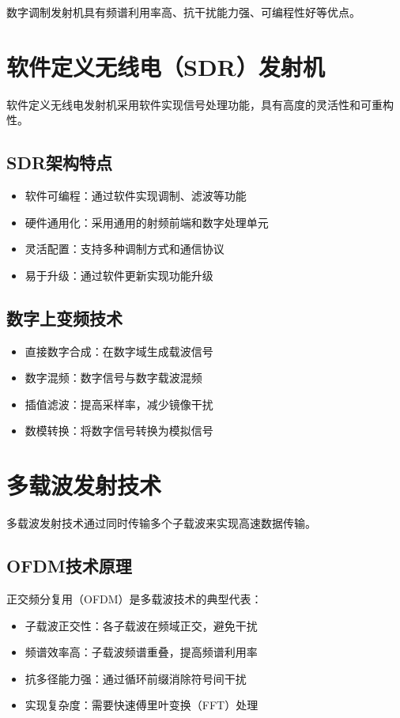 \documentclass[12pt,UTF8]{ctexbook}
\begin{document}
数字调制发射机具有频谱利用率高、抗干扰能力强、可编程性好等优点。

\section{软件定义无线电（SDR）发射机}

软件定义无线电发射机采用软件实现信号处理功能，具有高度的灵活性和可重构性。

\subsection{SDR架构特点}
\begin{itemize}[leftmargin=3.5em]
    \item 软件可编程：通过软件实现调制、滤波等功能
    \item 硬件通用化：采用通用的射频前端和数字处理单元
    \item 灵活配置：支持多种调制方式和通信协议
    \item 易于升级：通过软件更新实现功能升级
\end{itemize}

\subsection{数字上变频技术}
\begin{itemize}[leftmargin=3.5em]
    \item 直接数字合成：在数字域生成载波信号
    \item 数字混频：数字信号与数字载波混频
    \item 插值滤波：提高采样率，减少镜像干扰
    \item 数模转换：将数字信号转换为模拟信号
\end{itemize}

\section{多载波发射技术}

多载波发射技术通过同时传输多个子载波来实现高速数据传输。

\subsection{OFDM技术原理}
正交频分复用（OFDM）是多载波技术的典型代表：
\begin{itemize}[leftmargin=3.5em]
    \item 子载波正交性：各子载波在频域正交，避免干扰
    \item 频谱效率高：子载波频谱重叠，提高频谱利用率
    \item 抗多径能力强：通过循环前缀消除符号间干扰
    \item 实现复杂度：需要快速傅里叶变换（FFT）处理
\end{itemize}
\end{document}
